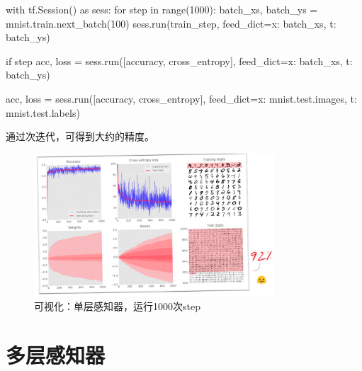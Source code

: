 \begin{content}
\begin{leftbar}
\begin{python}
with tf.Session() as sess:
  for step in range(1000):
    batch_xs, batch_ys = mnist.train.next_batch(100)        
    sess.run(train_step, feed_dict={x: batch_xs, t: batch_ys})
    
    if step %
      acc, loss = sess.run([accuracy, cross_entropy], 
        feed_dict={x: batch_xs, t: batch_ys})

      acc, loss = sess.run([accuracy, cross_entropy], 
        feed_dict={x: mnist.test.images, t: mnist.test.labels}) 
\end{python}
\end{leftbar}

通过次迭代，可得到大约的精度。

\begin{figure}[H]
\centering
\includegraphics[width=0.8\textwidth]{figures/mnist-slp-accuracy.png}
\caption{可视化：单层感知器，运行1000次step}
 \label{fig:mnist-slp-accuracy}
\end{figure}

\end{content}

\section{多层感知器}

